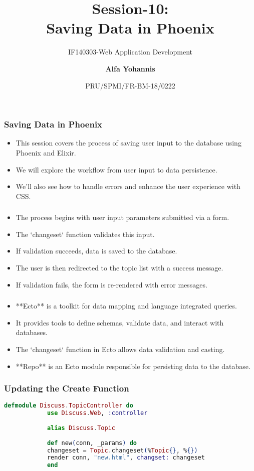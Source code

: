 \documentclass[aspectratio=169, table]{beamer}
\subtitle{IF140303-Web Application Development}
\title{\LARGE{Session-10:\\ Saving Data in Phoenix}}
\date[Serial]{\scriptsize {PRU/SPMI/FR-BM-18/0222}}
\author[Pradita]{\small{\textbf{Alfa Yohannis}}}
\begin{document}
	
	\frame{\titlepage}
	
	\begin{frame}
		\frametitle{Saving Data in Phoenix}
		\begin{itemize}
			\item This session covers the process of saving user input to the database using Phoenix and Elixir.
			\item We will explore the workflow from user input to data persistence.
			\item We’ll also see how to handle errors and enhance the user experience with CSS.
		\end{itemize}
	\end{frame}
	
	\begin{frame}
		\frametitle{}
		\begin{itemize}
			\item The process begins with user input parameters submitted via a form.
			\item The `changeset` function validates this input.
			\item If validation succeeds, data is saved to the database.
			\item The user is then redirected to the topic list with a success message.
			\item If validation fails, the form is re-rendered with error messages.
		\end{itemize}
	\end{frame}
	
	\begin{frame}
		\frametitle{\shortstack{Understanding \\ Ecto}}
		\begin{itemize}
			\item **Ecto** is a toolkit for data mapping and language integrated queries.
			\item It provides tools to define schemas, validate data, and interact with databases.
			\item The `changeset` function in Ecto allows data validation and casting.
			\item **Repo** is an Ecto module responsible for persisting data to the database.
		\end{itemize}
	\end{frame}
	
	\begin{frame}[fragile]
		\frametitle{Updating the Create Function}
		\begin{lstlisting}[language=Elixir]
			defmodule Discuss.TopicController do
			use Discuss.Web, :controller
			
			alias Discuss.Topic
			
			def new(conn, _params) do
			changeset = Topic.changeset(%Topic{}, %{})
			render conn, "new.html", changset: changeset
			end
		\end{lstlisting}
	\end{frame}
	
\end{document}

